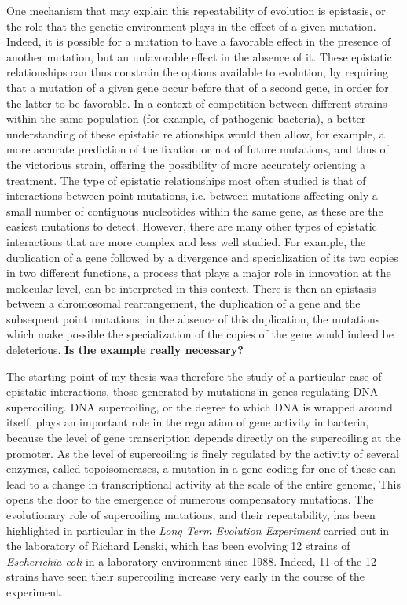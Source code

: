 One mechanism that may explain this repeatability of evolution is epistasis, or the role that the genetic environment plays in the effect of a given mutation.
Indeed, it is possible for a mutation to have a favorable effect in the presence of another mutation, but an unfavorable effect in the absence of it.
These epistatic relationships can thus constrain the options available to evolution, by requiring that a mutation of a given gene occur before that of a second gene, in order for the latter to be favorable.
In a context of competition between different strains within the same population (for example, of pathogenic bacteria), a better understanding of these epistatic relationships would then allow, for example, a more accurate prediction of the fixation or not of future mutations, and thus of the victorious strain, offering the possibility of more accurately orienting a treatment.
The type of epistatic relationships most often studied is that of interactions between point mutations, i.e. between mutations affecting only a small number of contiguous nucleotides within the same gene, as these are the easiest mutations to detect.
However, there are many other types of epistatic interactions that are more complex and less well studied.
For example, the duplication of a gene followed by a divergence and specialization of its two copies in two different functions, a process that plays a major role in innovation at the molecular level, can be interpreted in this context.
There is then an epistasis between a chromosomal rearrangement, the duplication of a gene and the subsequent point mutations; in the absence of this duplication, the mutations which make possible the specialization of the copies of the gene would indeed be deleterious. \textbf{Is the example really necessary?}

The starting point of my thesis was therefore the study of a particular case of epistatic interactions, those generated by mutations in genes regulating DNA supercoiling.
DNA supercoiling, or the degree to which DNA is wrapped around itself, plays an important role in the regulation of gene activity in bacteria, because the level of gene transcription depends directly on the supercoiling at the promoter.
As the level of supercoiling is finely regulated by the activity of several enzymes, called topoisomerases, a mutation in a gene coding for one of these can lead to a change in transcriptional activity at the scale of the entire genome,
This opens the door to the emergence of numerous compensatory mutations.
The evolutionary role of supercoiling mutations, and their repeatability, has been highlighted in particular in the \emph{Long Term Evolution Experiment} carried out in the laboratory of Richard Lenski, which has been evolving 12 strains of \emph{Escherichia coli} in a laboratory environment since 1988.
Indeed, 11 of the 12 strains have seen their supercoiling increase very early in the course of the experiment.

